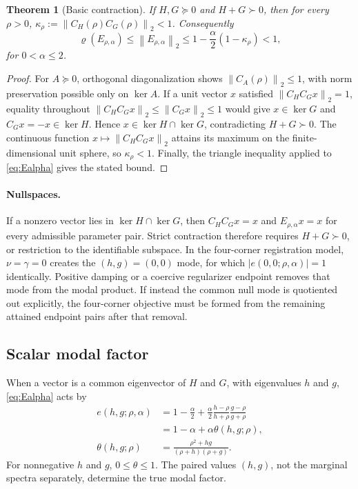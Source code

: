 \documentclass[pdflatex,iicol,sn-mathphys-num]{sn-jnl}
\newtheorem{theorem}{Theorem}[section]
\theoremstyle{definition}
\newcommand{\norm}[1]{\left\lVert #1\right\rVert}
\newcommand{\spr}{\varrho}
\begin{document}
\begin{theorem}[Basic contraction]\label{thm:contraction}
If $H,G\succeq0$ and $H+G\succ0$, then for every $\rho>0$,
$\kappa_\rho:=\norm{C_H(\rho)C_G(\rho)}_2<1$. Consequently
\[
\spr(E_{\rho,\alpha})\le\norm{E_{\rho,\alpha}}_2
\le 1-\frac{\alpha}{2}(1-\kappa_\rho)<1,
\]
for $0<\alpha\le2$.
\end{theorem}
\begin{proof}
For $A\succeq0$, orthogonal diagonalization shows
$\norm{C_A(\rho)}_2\le1$, with norm preservation possible only on $\ker A$.
If a unit vector $x$ satisfied $\norm{C_HC_Gx}_2=1$, equality throughout
$\norm{C_HC_Gx}_2\le\norm{C_Gx}_2\le1$ would give
$x\in\ker G$ and $C_Gx=-x\in\ker H$. Hence
$x\in\ker H\cap\ker G$, contradicting $H+G\succ0$. The continuous function
$x\mapsto\norm{C_HC_Gx}_2$ attains its maximum on the finite-dimensional unit
sphere, so $\kappa_\rho<1$. Finally, the triangle inequality applied to
\eqref{eq:Ealpha} gives the stated bound.
\end{proof}

\paragraph{Nullspaces.}
If a nonzero vector lies in $\ker H\cap\ker G$, then
$C_HC_Gx=x$ and $E_{\rho,\alpha}x=x$ for every admissible parameter pair.
Strict contraction therefore requires $H+G\succ0$, or restriction to the
identifiable subspace. In the four-corner registration model,
$\nu=\gamma=0$ creates the $(h,g)=(0,0)$ mode, for which
$|e(0,0;\rho,\alpha)|=1$ identically. Positive damping or a coercive
regularizer endpoint removes that mode from the modal product. If instead the
common null mode is quotiented out explicitly, the four-corner objective must
be formed from the remaining attained endpoint pairs after that removal.

\subsection{Scalar modal factor}
When a vector is a common eigenvector of $H$ and $G$, with eigenvalues $h$ and
$g$, \eqref{eq:Ealpha} acts by
\begin{align}
e(h,g;\rho,\alpha)
&=1-\frac{\alpha}{2}
+\frac{\alpha}{2}
\frac{h-\rho}{h+\rho}\frac{g-\rho}{g+\rho}\label{eq:modal}\\
&=1-\alpha+\alpha\theta(h,g;\rho),\nonumber\\
\theta(h,g;\rho)&=
\frac{\rho^2+hg}{(\rho+h)(\rho+g)}.\label{eq:theta}
\end{align}
For nonnegative $h$ and $g$, $0\le\theta\le1$. The paired values $(h,g)$,
not the marginal spectra separately, determine the true modal factor.
\end{document}
